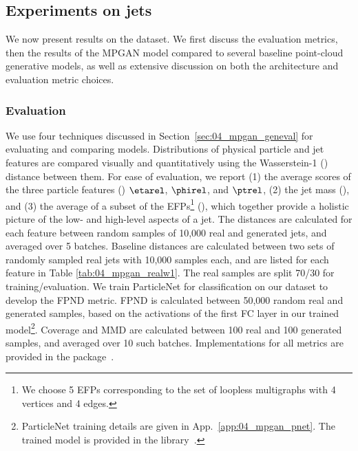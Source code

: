 \subsection{Experiments on jets}
\label{sec:04_mpgan_exp}

We now present results on the \jetnet dataset.
We first discuss the evaluation metrics, then the results of the MPGAN model compared to several baseline point-cloud generative models, as well as extensive discussion on both the architecture and evaluation metric choices.

\subsubsection{Evaluation}
\label{sec:04_mpgan_eval}

We use four techniques discussed in Section~\ref{sec:04_mpgan_geneval} for evaluating and comparing models.
Distributions of physical particle and jet features are compared visually and quantitatively using the Wasserstein-1 (\wass) distance between them.
For ease of evaluation, we report (1) the average scores of the three particle features (\wassp) $\etarel$, $\phirel$, and $\ptrel$, (2) the jet mass (\wassm), and (3) the average of a subset of the EFPs\footnote{We choose 5 EFPs corresponding to the set of loopless multigraphs with 4 vertices and 4 edges.}
(\wassefp), which together provide a holistic picture of the low- and high-level aspects of a jet.
The \wass distances are calculated for each feature between random samples of 10,000 real and generated jets, and averaged over 5 batches.
Baseline \wass distances are calculated between two sets of randomly sampled real jets with 10,000 samples each, and are listed for each feature in Table \ref{tab:04_mpgan_realw1}.
The real samples are split 70/30 for training/evaluation.
We train ParticleNet for classification on our dataset to develop the FPND metric.
FPND is calculated between 50,000 random real and generated samples, based on the activations of the first FC layer in our trained model\footnote{ParticleNet training details are given in App.~\ref{app:04_mpgan_pnet}. The trained model is provided in the \jetnet library~\cite{jetnetlib}.}.
Coverage and MMD are calculated between 100 real and 100 generated samples, and averaged over 10 such batches.
Implementations for all metrics are provided in the \jetnet package~\cite{jetnetlib}.

